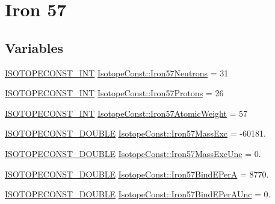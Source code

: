 \hypertarget{group___isotope_const-_iron-_fe57}{}\section{Iron 57}
\label{group___isotope_const-_iron-_fe57}
\subsection*{Variables}
\begin{DoxyCompactItemize}
\item 
\mbox{\hyperlink{group___isotope_const-_macros_ga5f18360b3e99483a35c32d789e62621c}{I\+S\+O\+T\+O\+P\+E\+C\+O\+N\+S\+T\+\_\+\+I\+NT}} \mbox{\hyperlink{group___isotope_const-_iron-_fe57_gaa043153f1bd948ea5c27cd802b05af1a}{Isotope\+Const\+::\+Iron57\+Neutrons}} = 31
\item 
\mbox{\hyperlink{group___isotope_const-_macros_ga5f18360b3e99483a35c32d789e62621c}{I\+S\+O\+T\+O\+P\+E\+C\+O\+N\+S\+T\+\_\+\+I\+NT}} \mbox{\hyperlink{group___isotope_const-_iron-_fe57_gacc4e1cf6909a3c765c10030f5c8dc329}{Isotope\+Const\+::\+Iron57\+Protons}} = 26
\item 
\mbox{\hyperlink{group___isotope_const-_macros_ga5f18360b3e99483a35c32d789e62621c}{I\+S\+O\+T\+O\+P\+E\+C\+O\+N\+S\+T\+\_\+\+I\+NT}} \mbox{\hyperlink{group___isotope_const-_iron-_fe57_gafea3a7ba389364244c7b4ad5d872b969}{Isotope\+Const\+::\+Iron57\+Atomic\+Weight}} = 57
\item 
\mbox{\hyperlink{group___isotope_const-_macros_ga8f45a7272ce02c0b4c65c44636ed719a}{I\+S\+O\+T\+O\+P\+E\+C\+O\+N\+S\+T\+\_\+\+D\+O\+U\+B\+LE}} \mbox{\hyperlink{group___isotope_const-_iron-_fe57_ga6215ea4a3694cf17075cf35871f793d5}{Isotope\+Const\+::\+Iron57\+Mass\+Exc}} = -\/60181.
\item 
\mbox{\hyperlink{group___isotope_const-_macros_ga8f45a7272ce02c0b4c65c44636ed719a}{I\+S\+O\+T\+O\+P\+E\+C\+O\+N\+S\+T\+\_\+\+D\+O\+U\+B\+LE}} \mbox{\hyperlink{group___isotope_const-_iron-_fe57_gacfd29e3adc3e9c692942710fa76d6122}{Isotope\+Const\+::\+Iron57\+Mass\+Exc\+Unc}} = 0.
\item 
\mbox{\hyperlink{group___isotope_const-_macros_ga8f45a7272ce02c0b4c65c44636ed719a}{I\+S\+O\+T\+O\+P\+E\+C\+O\+N\+S\+T\+\_\+\+D\+O\+U\+B\+LE}} \mbox{\hyperlink{group___isotope_const-_iron-_fe57_gadd8ac2eca4d1ff480ebd5b93d337ccdf}{Isotope\+Const\+::\+Iron57\+Bind\+E\+PerA}} = 8770.
\item 
\mbox{\hyperlink{group___isotope_const-_macros_ga8f45a7272ce02c0b4c65c44636ed719a}{I\+S\+O\+T\+O\+P\+E\+C\+O\+N\+S\+T\+\_\+\+D\+O\+U\+B\+LE}} \mbox{\hyperlink{group___isotope_const-_iron-_fe57_gae9874c2dd75c460c17ca5fa7ee189177}{Isotope\+Const\+::\+Iron57\+Bind\+E\+Per\+A\+Unc}} = 0.

\end{DoxyCompactItemize}

